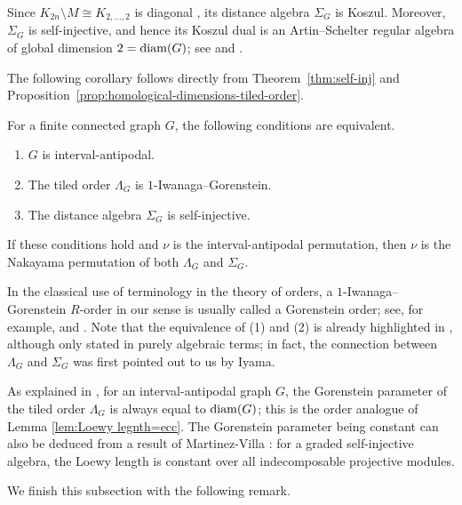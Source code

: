 \documentclass[a4paper,leqno]{amsart}
\begin{document}
\begin{rmk}
Since $K_{2n}\setminus M\cong K_{2,\ldots,2}$ is diagonal
\cite[Example~7.6]{HW17}, its distance algebra
\(\Sigma_G\) is Koszul. Moreover, $\Sigma_G$ is self-injective, and
hence its Koszul dual is an Artin--Schelter regular algebra of global dimension $2=\operatorname{diam}(G)$; see \cite[Proposition~5.10]{Smi96} and \cite{MV99}.
\end{rmk}

The following corollary follows directly from Theorem~\ref{thm:self-inj} and Proposition~\ref{prop:homological-dimensions-tiled-order}.

\begin{cor} 
\label{thm:tiled-gorenstein-antipodal}
For a finite connected graph $G$, the following conditions are
equivalent.
\begin{enumerate}
    \item $G$ is interval-antipodal.
    \item The tiled order $\Lambda_G$ is \(1\)-Iwanaga--Gorenstein.
    \item The distance algebra $\Sigma_G$ is self-injective.
\end{enumerate}
If these conditions hold and $\nu$ is the interval-antipodal
permutation, then $\nu$ is the Nakayama permutation of both
$\Lambda_G$ and $\Sigma_G$.
\end{cor}
\begin{rmk}
    In the classical use of terminology in the theory of orders, a \(1\)-Iwanaga--Gorenstein $R$-order in our sense is usually called a Gorenstein order; see, for example, \cite[Definition 6.1]{DKR67} and \cite[Section~2]{Rog73}.
    Note that the equivalence of (1) and (2) is already highlighted in \cite[Section~2.3]{IL26}, although only  stated in purely algebraic terms; in fact, the connection between $\Lambda_G$ and $\Sigma_G$ was first pointed out to us by Iyama.
\end{rmk}
\begin{rmk}
As explained in \cite{IL26}, for an interval-antipodal graph $G$, the Gorenstein parameter of the tiled order $\Lambda_G$ is always equal to $\operatorname{diam}(G)$; this is the order analogue of Lemma \ref{lem:Loewy legnth=ecc}.  The Gorenstein parameter being constant can also be deduced from a result of Martinez-Villa \cite[Theorem 3.3]{MV99}: for a graded self-injective algebra, the Loewy length is constant over all indecomposable projective modules.
\end{rmk}

We finish this subsection with the following remark.
\end{document}
